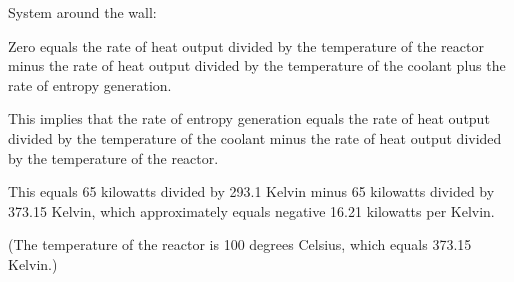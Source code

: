 System around the wall:

Zero equals the rate of heat output divided by the temperature of the reactor minus the rate of heat output divided by the temperature of the coolant plus the rate of entropy generation.

This implies that the rate of entropy generation equals the rate of heat output divided by the temperature of the coolant minus the rate of heat output divided by the temperature of the reactor.

This equals 65 kilowatts divided by 293.1 Kelvin minus 65 kilowatts divided by 373.15 Kelvin, which approximately equals negative 16.21 kilowatts per Kelvin.

(The temperature of the reactor is 100 degrees Celsius, which equals 373.15 Kelvin.)